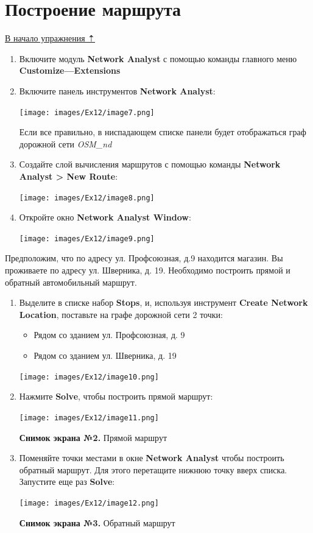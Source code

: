 \documentclass[12pt,]{book}
\providecommand{\tightlist}{%
  \setlength{\itemsep}{0pt}\setlength{\parskip}{0pt}}
\begin{document}
\hypertarget{network-analysis-route}{%
\section{Построение маршрута}\label{network-analysis-route}}

\protect\hyperlink{network-analysis}{В начало упражнения ⇡}

\begin{enumerate}
\def\labelenumi{\arabic{enumi}.}
\item
  Включите модуль \textbf{Network Analyst} с помощью команды главного меню
  \textbf{Customize---Extensions}
\item
  Включите панель инструментов \textbf{Network Analyst}:

  \texttt{[image: images/Ex12/image7.png]}

  Если все правильно, в ниспадающем списке панели будет отображаться граф дорожной сети \emph{OSM\_nd}
\item
  Создайте слой вычисления маршрутов с помощью команды \textbf{Network Analyst \textgreater{} New Route}:

  \texttt{[image: images/Ex12/image8.png]}
\item
  Откройте окно \textbf{Network Analyst Window}:

  \texttt{[image: images/Ex12/image9.png]}
\end{enumerate}

Предположим, что по адресу ул. Профсоюзная, д.9 находится магазин. Вы проживаете по адресу ул. Шверника, д. 19. Необходимо построить прямой и обратный автомобильный маршрут.

\begin{enumerate}
\def\labelenumi{\arabic{enumi}.}
\item
  Выделите в списке набор \textbf{Stops}, и, используя инструмент \textbf{Create Network Location}, поставьте на графе дорожной сети 2 точки:

  \begin{itemize}
  \tightlist
  \item
    Рядом со зданием ул. Профсоюзная, д. 9
  \item
    Рядом со зданием ул. Шверника, д. 19
  \end{itemize}

  \texttt{[image: images/Ex12/image10.png]}
\item
  Нажмите \textbf{Solve}, чтобы построить прямой маршрут:

  \texttt{[image: images/Ex12/image11.png]}

  \textbf{Снимок экрана №2.} Прямой маршрут
\item
  Поменяйте точки местами в окне \textbf{Network Analyst} чтобы построить обратный маршрут. Для этого перетащите нижнюю точку вверх списка. Запустите еще раз \textbf{Solve}:

  \texttt{[image: images/Ex12/image12.png]}

  \textbf{Снимок экрана №3.} Обратный маршрут
\end{enumerate}
\end{document}
